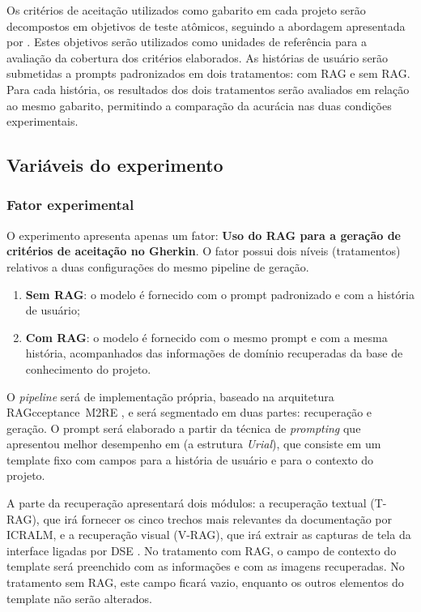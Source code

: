 Os critérios de aceitação utilizados como gabarito em cada projeto serão decompostos em objetivos de teste atômicos, seguindo a abordagem apresentada por \cite{wang2025}. Estes objetivos serão utilizados como unidades de referência para a avaliação da cobertura dos critérios elaborados. As histórias de usuário serão submetidas a prompts padronizados em dois tratamentos: com RAG e sem RAG. Para cada história, os resultados dos dois tratamentos serão avaliados em relação ao mesmo gabarito, permitindo a comparação da acurácia nas duas condições experimentais.

\subsection{Variáveis do experimento}

\subsubsection*{Fator experimental}
O experimento apresenta apenas um fator: \textbf{Uso do RAG para a geração de critérios de aceitação no Gherkin}. O fator possui dois níveis (tratamentos) relativos a duas configurações do mesmo pipeline de geração.

\begin{enumerate} 
    \item \textbf{Sem RAG}: o modelo é fornecido com o prompt padronizado e com a história de usuário; 
    \item \textbf{Com RAG}: o modelo é fornecido com o mesmo prompt e com a mesma história, acompanhados das informações de domínio recuperadas da base de conhecimento do projeto. 
\end{enumerate}

O \textit{pipeline} será de implementação própria, baseado na arquitetura RAGcceptance~M2RE \cite{wang2025}, e será segmentado em duas partes: recuperação e geração. O prompt será elaborado a partir da técnica de \textit{prompting} que apresentou melhor desempenho em  (a estrutura \textit{Urial}), que consiste em um template fixo com campos para a história de usuário e para o contexto do projeto.

A parte da recuperação apresentará dois módulos: a recuperação textual (T-RAG), que irá fornecer os cinco trechos mais relevantes da documentação por ICRALM, e a recuperação visual (V-RAG), que irá extrair as capturas de tela da interface ligadas por DSE \cite{wang2025}. No tratamento com RAG, o campo de contexto do template será preenchido com as informações e com as imagens recuperadas. No tratamento sem RAG, este campo ficará vazio, enquanto os outros elementos do template não serão alterados.

